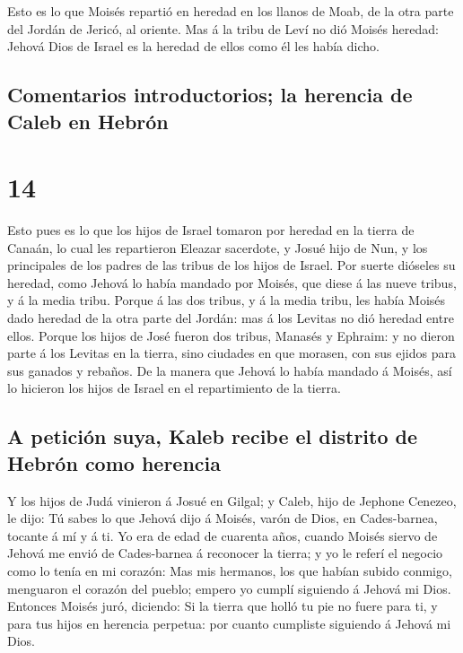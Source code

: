  Esto es lo que Moisés repartió en heredad en los llanos
de Moab, de la otra parte del Jordán de Jericó, al oriente.
 Mas á la tribu de Leví no dió Moisés heredad: Jehová
Dios de Israel es la heredad de ellos como él les había dicho.

\hypertarget{comentarios-introductorios-la-herencia-de-caleb-en-hebruxf3n}{%
\subsection{Comentarios introductorios; la herencia de Caleb en
Hebrón}\label{comentarios-introductorios-la-herencia-de-caleb-en-hebruxf3n}}

\hypertarget{section-06-14}{%
\section{14}\label{section-06-14}}

 Esto pues es lo que los hijos de Israel tomaron por
heredad en la tierra de Canaán, lo cual les repartieron Eleazar
sacerdote, y Josué hijo de Nun, y los principales de los padres de las
tribus de los hijos de Israel.  Por suerte dióseles su
heredad, como Jehová lo había mandado por Moisés, que diese á las nueve
tribus, y á la media tribu.  Porque á las dos tribus, y á
la media tribu, les había Moisés dado heredad de la otra parte del
Jordán: mas á los Levitas no dió heredad entre ellos. 
Porque los hijos de José fueron dos tribus, Manasés y Ephraim: y no
dieron parte á los Levitas en la tierra, sino ciudades en que morasen,
con sus ejidos para sus ganados y rebaños.  De la manera
que Jehová lo había mandado á Moisés, así lo hicieron los hijos de
Israel en el repartimiento de la tierra.

\hypertarget{a-peticiuxf3n-suya-kaleb-recibe-el-distrito-de-hebruxf3n-como-herencia}{%
\subsection{A petición suya, Kaleb recibe el distrito de Hebrón como
herencia}\label{a-peticiuxf3n-suya-kaleb-recibe-el-distrito-de-hebruxf3n-como-herencia}}

 Y los hijos de Judá vinieron á Josué en Gilgal; y Caleb,
hijo de Jephone Cenezeo, le dijo: Tú sabes lo que Jehová dijo á Moisés,
varón de Dios, en Cades-barnea, tocante á mí y á ti.  Yo
era de edad de cuarenta años, cuando Moisés siervo de Jehová me envió de
Cades-barnea á reconocer la tierra; y yo le referí el negocio como lo
tenía en mi corazón:  Mas mis hermanos, los que habían
subido conmigo, menguaron el corazón del pueblo; empero yo cumplí
siguiendo á Jehová mi Dios.  Entonces Moisés juró,
diciendo: Si la tierra que holló tu pie no fuere para ti, y para tus
hijos en herencia perpetua: por cuanto cumpliste siguiendo á Jehová mi
Dios.

